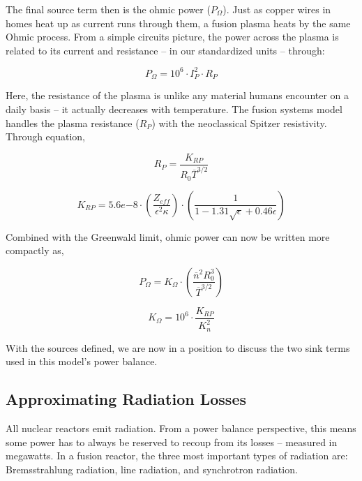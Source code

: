 The final source term then is the ohmic power ($P_\Omega$). Just as copper wires in homes heat up as current runs through them, a fusion plasma heats by the same Ohmic process. From a simple circuits picture, the power across the plasma is related to its current and resistance -- in our standardized units -- through:

\begin{equation}
	\label{eq:pohmic_basic}
	P_\Omega = 10^6 \cdot I_P^2 \cdot R_P
\end{equation}

Here, the resistance of the plasma is unlike any material humans encounter on a daily basis -- it actually decreases with temperature. The fusion systems model handles the plasma resistance ($R_P$)  with the neoclassical Spitzer resistivity. Through equation,

\begin{equation}
	\label{eq:rp}
	R_P = \frac{K_{RP}}{R_0 \overline T ^ {3/2}}
\end{equation}

\begin{equation}
	K_{RP} = 5.6e{-8} \cdot \left( \frac{ Z_{eff} }{ \epsilon^2 \kappa } \right) \cdot \left( \frac{1}{ 1 - 1.31 \sqrt{ \epsilon } + 0.46 \epsilon } \right)
\end{equation}

Combined with the Greenwald limit, ohmic power can now be written more compactly as,

\begin{equation}
	\label{eq:pohmic}
	P_\Omega = K_\Omega \cdot \left( \frac{ \overline n ^ 2 R_0^3 }{\overline T ^ {3/2}} \right)
\end{equation}

\begin{equation}
	K_\Omega = 10^6 \cdot \frac{K_{RP}}{K_n^2}
\end{equation}

With the sources defined, we are now in a position to discuss the two sink terms used in this model's power balance.

\subsection{Approximating Radiation Losses}

All nuclear reactors emit radiation. From a power balance perspective, this means some power has to always be reserved to recoup from its losses -- measured in megawatts. In a fusion reactor, the three most important types of radiation are: Bremsstrahlung radiation, line radiation, and synchrotron radiation. 

